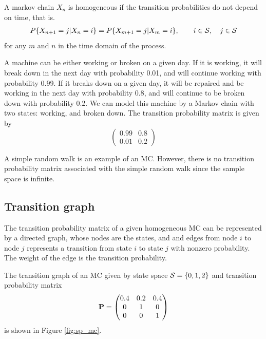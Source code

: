 \begin{definition}
A markov chain $X_n$ is homogeneous if the transition probabilities do not depend on time, that is.
\begin{align}
P\{X_{n+1}=j| X_n=i\} = P\{X_{m+1}=j| X_m=i\},   \qquad i \in {\cal S},\quad  j \in {\cal S} 
\end{align}
for any $m$ and $n$ in the time domain of the process.
\end{definition}


\begin{example}
A machine can be either working or broken on a given day. If it is working, it will break down in the next day with probability 0.01, and will continue working with probability 0.99. If it breaks down
on a given day, it will be repaired and be working in the next day with probability 0.8, and will continue to be broken down with probability 0.2. We can model this machine by a Markov chain with two states: working, and broken down. The transition probability matrix is given by
$$
\begin{pmatrix}
0.99 & 0.8 \\
0.01 & 0.2
\end{pmatrix}
$$
\end{example}

\begin{example}[SRW]
A simple random walk is an example of an MC. However, there is no transition probability matrix associated with the simple random walk since the sample space is infinite.
\end{example}

\subsection{Transition graph}

The transition probability matrix of a given homogeneous MC can be  represented by a directed graph, whose nodes are the states, and and edges from node $i$ to node $j$ represents a transition from state $i$ to state $j$ with nonzero probability. The weight of the edge is the transition probability.

\begin{example}\label{sp:MC3ex}
The transition graph of an MC given by state space ${\cal S} = \{0, 1, 2\}$ and transition probability matrix
\begin{align}
\label{sp:MC3example}
{\bf P} = \begin{pmatrix}
0.4 & 0.2 & 0.4 \\
0   & 1   & 0 \\
0   & 0   & 1 
\end{pmatrix}
\end{align}
is shown in Figure \ref{fig:sp_mc}.
\end{example}

